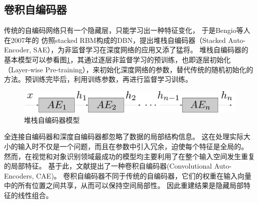 \subsection{卷积自编码器}
传统的自编码网络只有一个隐藏层，只能学习出一种特征变化，
于是Bengio\cite{bengio2007greedy}等人在2007年的
仿照stacked RBM构成的DBN，提出堆栈自编码器（Stacked Auto-Encoder, SAE），为非监督学习在深度网络的应用又添了猛将。
堆栈自编码器的基本模型可以参看图\ref{fig:sae}，其通过逐层非监督学习的预训练，也即逐层初始化（Layer-wise Pre-training），来初始化深度网络的参数，替代传统的随机初始化的方法。预训练完毕后，利用训练参数，再进行监督学习训练。

\begin{figure}
	\centering
	\includegraphics[width=\textwidth]{figures/AE/sae}
	\caption{堆栈自编码器模型}
	\label{fig:sae}
\end{figure}

全连接自编码器和深度自编码器都忽略了数据的局部结构信息。
这在处理实际大小的输入时不仅是一个问题，而且在参数中引入冗余，迫使每个特征是全局的。
然而，在视觉和对象识别领域最成功的模型\cite{lowe1999object}均主要利用了在整个输入空间发生重复的局部特征。
基于此，文献\cite{masci2011stacked}提出了一种卷积自编码器(Convolutional Auto-Encoders, CAE)。
卷积自编码器不同于传统的自编码器，它们的权重在输入向量中的所有位置之间共享，从而可以保持空间局部性。
因此重建结果是隐藏局部特征的线性组合。


